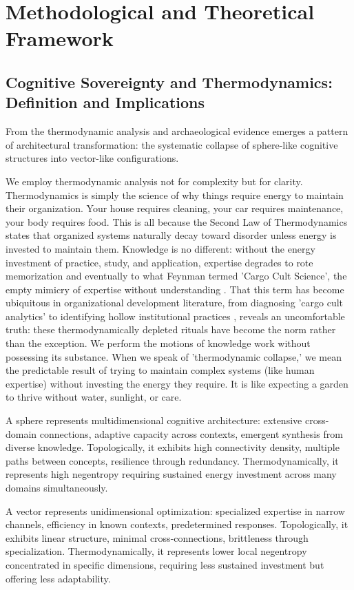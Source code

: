 \section{Methodological and Theoretical Framework}
\subsection{Cognitive Sovereignty and Thermodynamics: Definition and Implications}

From the thermodynamic analysis and archaeological evidence emerges a pattern of architectural transformation: the systematic collapse of sphere-like cognitive structures into vector-like configurations.

We employ thermodynamic analysis not for complexity but for clarity. Thermodynamics is simply the science of why things require energy to maintain their organization. Your house requires cleaning, your car requires maintenance, your body requires food. This is all because the Second Law of Thermodynamics states that organized systems naturally decay toward disorder unless energy is invested to maintain them. Knowledge is no different: without the energy investment of practice, study, and application, expertise degrades to rote memorization and eventually to what Feynman termed 'Cargo Cult Science', the empty mimicry of expertise without understanding \citep{feynman1974}. That this term has become ubiquitous in organizational development literature, from diagnosing 'cargo cult analytics' \citep{mcnamee2019} to identifying hollow institutional practices \citep{alvesson2013}, reveals an uncomfortable truth: these thermodynamically depleted rituals have become the norm rather than the exception. We perform the motions of knowledge work without possessing its substance. When we speak of 'thermodynamic collapse,' we mean the predictable result of trying to maintain complex systems (like human expertise) without investing the energy they require. It is like expecting a garden to thrive without water, sunlight, or care.

A sphere represents multidimensional cognitive architecture: extensive cross-domain connections, adaptive capacity across contexts, emergent synthesis from diverse knowledge. Topologically, it exhibits high connectivity density, multiple paths between concepts, resilience through redundancy. Thermodynamically, it represents high negentropy requiring sustained energy investment across many domains simultaneously.

A vector represents unidimensional optimization: specialized expertise in narrow channels, efficiency in known contexts, predetermined responses. Topologically, it exhibits linear structure, minimal cross-connections, brittleness through specialization. Thermodynamically, it represents lower local negentropy concentrated in specific dimensions, requiring less sustained investment but offering less adaptability.

